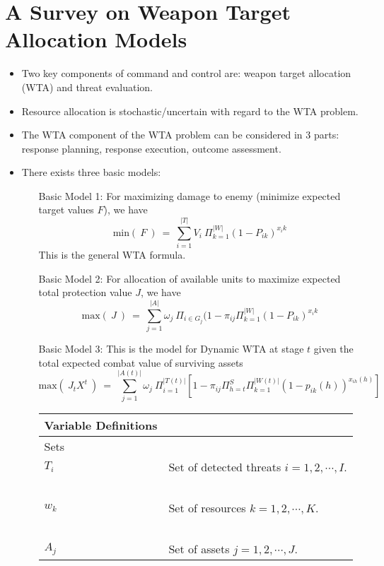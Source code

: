 \documentclass[12pt]{article} %
\begin{document}
\section*{A Survey on Weapon Target Allocation Models \\ \cite{Ghanbari2021ASO}}
\begin{itemize}
\item Two key components of command and control are: weapon target allocation (WTA) and threat evaluation.
\item Resource allocation is stochastic/uncertain with regard to the WTA problem.
\item The WTA component of the WTA problem can be considered in 3 parts: response planning, response execution, outcome assessment.
\item There exists three basic models:
\begin{center}
\begin{enumerate}
    \item[Basic Model 1:] For maximizing damage to enemy (minimize expected target values $F$), we have \[\text{min}(\ F\ )\ =\ \sum_{i=1}^{|T|}V_i\ \Pi_{k=1}^{|W|}(1 - P_{ik})^{x_ik}\]
    This is the general WTA formula.
    \item[Basic Model 2:] For allocation of available units to maximize expected total protection value $J$, we have \[\text{max}(\ J\ )\ =\ \sum_{j=1}^{|A|}\omega_j\ \Pi_{i \in G_j}(1 - \pi_{ij}\Pi_{k=1}^{|W|}(1 - P_{ik})^{x_ik}\]
    \item[Basic Model 3:] This is the model for Dynamic WTA at stage $t$ given the total expected combat value of surviving assets \[\text{max}(\ J_tX^t\ )\ =\ \sum_{j=1}^{|A(t)|}\omega_j\ \Pi_{i=1}^{|T(t)|}\left[1 - \pi_{ij}\Pi_{h=t}^S\Pi_{k=1}^{|W(t)|}(1-p_{ik}(h))^{x_{ih}(h)}\right]\]
    \item[]
    \begin{center}
    \begin{tabular}{|p{4.25cm}  p{8cm}|}
    		\hline
    		\textbf{Variable Definitions} & \ \\
            \hline
            Sets & \\
    		\hline
    		$T_i$ & Set of detected threats $i = 1, 2, \cdots, I$. \\
            \ & \ \\
    		$w_k$ & Set of resources $k = 1, 2, \cdots, K$. \\
            \ & \ \\
    		$A_j$ & Set of assets $j = 1, 2, \cdots, J$. \\

\end{tabular}
\end{center}
\end{enumerate}
\end{center}
\end{itemize}
\end{document}

